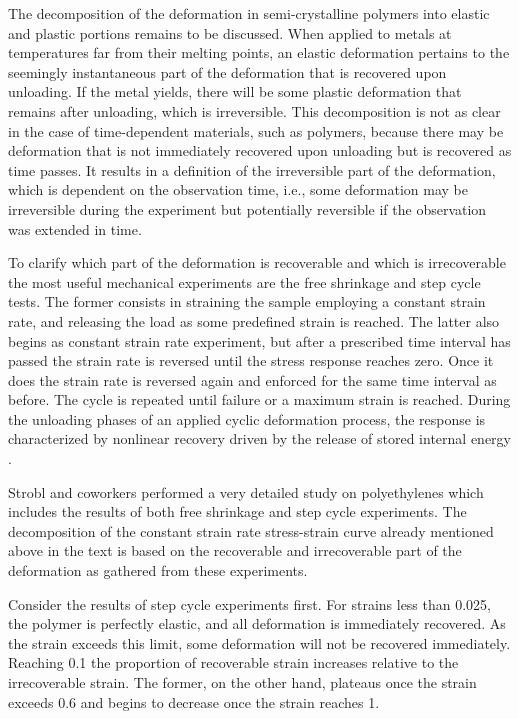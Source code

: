 The decomposition of the deformation in semi-crystalline polymers into elastic and plastic portions remains to be discussed.
When applied to metals at temperatures far from their melting points, an elastic deformation pertains to the seemingly instantaneous part of the deformation that is recovered upon unloading.
If the metal yields, there will be some plastic deformation that remains after unloading, which is irreversible.
This decomposition is not as clear in the case of time-dependent materials, such as polymers, because there may be deformation that is not immediately recovered upon unloading but is recovered as time passes.
It results in a definition of the irreversible part of the deformation, which is dependent on the observation time, i.e., some deformation may be irreversible during the experiment but potentially reversible if the observation was extended in time.

To clarify which part of the deformation is recoverable and which is irrecoverable the most useful mechanical experiments are the free shrinkage and step cycle tests.
The former consists in straining the sample employing a constant strain rate, and releasing the load as some predefined strain is reached.
The latter also begins as constant strain rate experiment, but after a prescribed time interval has passed the strain rate is reversed until the stress response reaches zero.
Once it does the strain rate is reversed again and enforced for the same time interval as before.
The cycle is repeated until failure or a maximum strain is reached.
During the unloading phases of an applied cyclic deformation process, the response is characterized by nonlinear recovery driven by the release of stored internal energy \citep{bergstromConstitutiveModelingUltrahigh2002}.

Strobl and coworkers \citep{hissNetworkStretchingSlip1999, hobeikaTemperatureStrainRate2000, hongModelTreatingTensile2004, hongModelTreatmentTensile2004, naViscousForceDominatedTensileDeformation2006} performed a very detailed study on polyethylenes which includes the results of both free shrinkage and step cycle experiments.
The decomposition of the constant strain rate stress-strain curve already mentioned above in the text is based on the recoverable and irrecoverable part of the deformation as gathered from these experiments.

Consider the results of step cycle experiments first.
For strains less than 0.025, the polymer is perfectly elastic, and all deformation is immediately recovered.
As the strain exceeds this limit, some deformation will not be recovered immediately.
Reaching 0.1 the proportion of recoverable strain increases relative to the irrecoverable strain.
The former, on the other hand, plateaus once the strain exceeds 0.6 and begins to decrease once the strain reaches 1.

